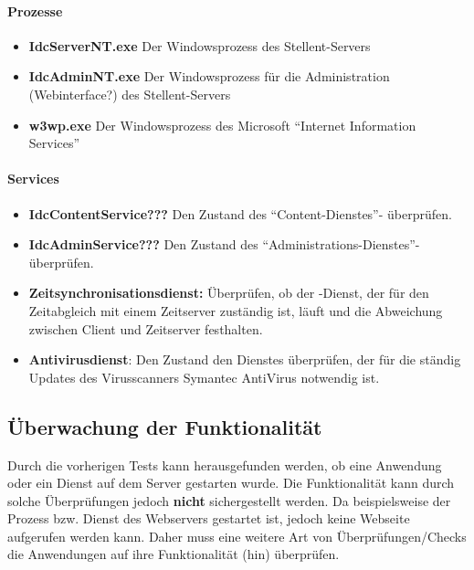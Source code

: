 \paragraph{Prozesse}
\begin{itemize}
\item \textbf{IdcServerNT.exe} Der Windowsprozess des Stellent-Servers
\item \textbf{IdcAdminNT.exe} Der Windowsprozess für die Administration (Webinterface?) des Stellent-Servers
\item \textbf{w3wp.exe} Der Windowsprozess des Microsoft "`Internet Information Services"'
\end{itemize}

\paragraph{Services}
\begin{itemize}
\item \textbf{IdcContentService???}  Den Zustand des "`Content-Dienstes"'- überprüfen.
\item \textbf{IdcAdminService???}  Den Zustand des "`Administrations-Dienstes"'- überprüfen.
\item \textbf{Zeitsynchronisationsdienst:} Überprüfen, ob der -Dienst, der für den Zeitabgleich mit einem Zeitserver zuständig ist, läuft und die Abweichung zwischen Client und Zeitserver festhalten.
\item \textbf{Antivirusdienst}: Den Zustand den Dienstes überprüfen, der für die ständig Updates des Virusscanners Symantec AntiVirus notwendig ist.
\end{itemize}

\subsection{Überwachung der Funktionalität}
\label{funztest}
Durch die vorherigen Tests kann herausgefunden werden, ob eine Anwendung oder ein Dienst auf dem Server gestarten wurde.
Die Funktionalität kann durch solche Überprüfungen jedoch \textbf{nicht} sichergestellt werden.
Da beispielsweise der Prozess bzw. Dienst des Webservers gestartet ist, jedoch keine Webseite aufgerufen werden kann.
Daher muss eine weitere Art von Überprüfungen/Checks die Anwendungen auf ihre Funktionalität (hin) überprüfen.

